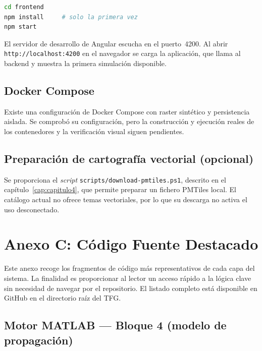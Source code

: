 \begin{lstlisting}[language=bash, caption={Arranque del frontend.}]
cd frontend
npm install     # solo la primera vez
npm start
\end{lstlisting}

El servidor de desarrollo de Angular escucha en el puerto~4200. Al abrir
\texttt{http://localhost:4200} en el navegador se carga la aplicación, que llama
al backend y muestra la primera simulación disponible.

\section{Docker Compose}
Existe una configuración de Docker Compose con raster sintético y persistencia
aislada. Se comprobó su configuración, pero la construcción y ejecución reales de
los contenedores y la verificación visual siguen pendientes.

\section{Preparación de cartografía vectorial (opcional)}

Se proporciona el \textit{script}
\texttt{scripts/download-pmtiles.ps1}, descrito en el capítulo~\ref{cap:capitulo4},
que permite preparar un fichero PMTiles local. El catálogo actual no ofrece temas
vectoriales, por lo que su descarga no activa el uso desconectado.

\chapter{Anexo C: Código Fuente Destacado}
\label{anx:codigo}

Este anexo recoge los fragmentos de código más representativos de cada capa del
sistema. La finalidad es proporcionar al lector un acceso rápido a la lógica
clave sin necesidad de navegar por el repositorio. El listado completo está
disponible en GitHub en el directorio raíz del TFG.

\section{Motor MATLAB --- Bloque 4 (modelo de propagación)}

